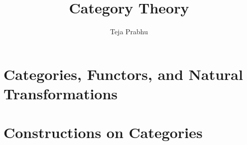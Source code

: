 \documentclass[11pt]{article}
\title{\textbf{Category Theory}}
\author{Teja Prabhu}
\date{}
\begin{document}
\maketitle
\newpage
\tableofcontents

\newpage
\section{Categories, Functors, and Natural Transformations}






\newpage
\section{Constructions on Categories}
\end{document}
